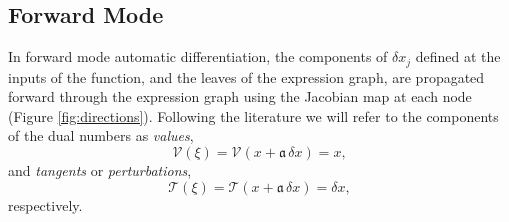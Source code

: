 \subsection{Forward Mode}

In forward mode automatic differentiation, the components of $\delta x_{j}$ defined at 
the inputs of the function, and the leaves of the expression graph, are propagated forward 
through the expression graph using the Jacobian map at each node (Figure \ref{fig:directions}).  
Following the literature we will refer to the components of the dual numbers as \textit{values},
%
\begin{equation*}
\mathcal{V} \! \left( \xi \right) 
= \mathcal{V} \! \left( x + \mathfrak{a} \, \delta x \right) 
= x,
\end{equation*}
%
and \textit{tangents} or \textit{perturbations},
\begin{equation*}
\mathcal{T} \! \left( \xi \right) 
= \mathcal{T} \! \left( x + \mathfrak{a} \, \delta x \right) 
= \delta x,
\end{equation*}
%
respectively.

